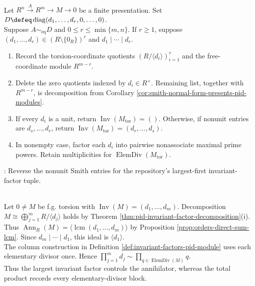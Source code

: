 \begin{method} \label{meth:smith-form-module-presentation} \\
Let $R^n\xrightarrow{A}R^m\to M\to0$ be a finite presentation. Set $D\defeq\operatorname{diag}(d_1,\ldots,d_r,0,\ldots,0)$.\\
Suppose $A\sim_{\mathrm{eq}}D$ and $0\leq r\leq\min\{m,n\}$. If $r\geq1$, suppose $(d_1,\ldots,d_r)\in(R\setminus\{0_R\})^r$ and $d_1\mid\cdots\mid d_r$.
\begin{enumerate}[label=(\roman*)]
\setlength{\itemsep}{0pt}
\item Record the torsion-coordinate quotients $(R/\langle d_i\rangle)_{i=1}^r$ and the free-coordinate module $R^{m-r}$.
\item Delete the zero quotients indexed by $d_i\in R^\times$. Remaining list, together with $R^{m-r}$, is decomposition from Corollary \ref{cor:smith-normal-form-presents-pid-modules}.
\item If every $d_i$ is a unit, return $\operatorname{Inv}(M_{\operatorname{tor}})=()$. Otherwise, if nonunit entries are $d_s,\ldots,d_r$, return $\operatorname{Inv}(M_{\operatorname{tor}})=(d_r,\ldots,d_s)$.
\item In nonempty case, factor each $d_i$ into pairwise nonassociate maximal prime powers. Retain multiplicities for $\operatorname{ElemDiv}(M_{\operatorname{tor}})$.
\end{enumerate}
: Reverse the nonunit Smith entries for the repository's largest-first invariant-factor tuple.
\end{method}

\begin{perspective} \label{per:invariant-factors-order-and-characteristic-polynomial} \\
Let $0\neq M$ be f.g. torsion with $\operatorname{Inv}(M)=(d_1,\ldots,d_m)$. Decomposition $M\cong\bigoplus\limits_{j=1}^mR/\langle d_j\rangle$ holds by Theorem \ref{thm:pid-invariant-factor-decomposition}(i).\\
Thus $\operatorname{Ann}_R(M)=\langle\operatorname{lcm}(d_1,\ldots,d_m)\rangle$ by Proposition \ref{prop:orders-direct-sum-lcm}. Since $d_m\mid\cdots\mid d_1$, this ideal is $\langle d_1\rangle$.\\
The column construction in Definition \ref{def:invariant-factors-pid-module} uses each elementary divisor once. Hence $\prod\limits_{j=1}^md_j\sim\prod\limits_{q\in\operatorname{ElemDiv}(M)}q$.\\
Thus the largest invariant factor controls the annihilator, whereas the total product records every elementary-divisor block.
\end{perspective}

